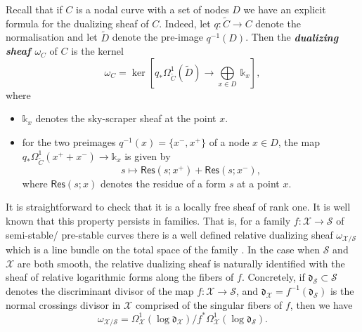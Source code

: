 \documentclass[11pt]{amsart}
\theoremstyle{plain}
\numberwithin{equation}{section}
\theoremstyle{definition}
\theoremstyle{plain}
\begin{document}
\noindent
Recall that if $C$ is a nodal curve with a set of nodes $D$ we have an explicit formula for the dualizing sheaf of $C$. Indeed, let  $q: \widetilde{C}\longrightarrow C$ denote the normalisation and let $\widetilde D$ denote the pre-image $q^{-1}(D)$. Then the \emph{\bfseries dualizing sheaf $\omega_C$} of $C$ is the kernel  
\begin{equation}
\omega_{C} = \ker \left[q_*\Omega_{\widetilde C}^{1}(\widetilde D)\longrightarrow \underset{x\in D}\bigoplus \ \mathbb k_x\right],
\end{equation}
where 
\begin{itemize}
\item $\mathbb k_x$ denotes the sky-scraper sheaf at the point $x$.
\item for the two preimages $q^{-1}(x) = \{x^{-},x^{+}\}$ of a node $x \in D$, the map \linebreak $q_*\Omega_{\widetilde C}^{1}(x^++x^-)\longrightarrow \mathbb k_x$ is given by 
\begin{equation}\label{res908}
s \mapsto \mathsf{Res}(s; x^+)+\mathsf{Res}(s;x^-), 
\end{equation}
where $\mathsf{Res}(s; x)$ denotes the residue of a form $s$ at a point $x$.
\end{itemize}
It is straightforward to check that it is a locally free sheaf of rank one.
It is well known  that this property persists in families. That is, for a family $f : \mathcal{X} \to \mathcal{S}$ of semi-stable/ pre-stable curves there is a well defined relative dualizing sheaf $\omega_{\mathcal{X}/\mathcal{S}}$ which is a line bundle on the total space of the family \cite[109.19 The relative dualizing sheaf]{34}. In the case when $\mathcal{S}$ and $\mathcal{X}$ are both smooth, the relative dualizing sheaf is naturally identified with the sheaf of relative logarithmic  forms along the fibers of $f$. Concretely, if 
$\boldsymbol{\mathfrak{d}}_{\mathcal{S}} \subset  \mathcal{S}$ denotes the discriminant divisor of the map 
$f : \mathcal{X} \to \mathcal{S}$, and $\boldsymbol{\mathfrak{d}}_{\mathcal{X}} = f^{-1}\left(\boldsymbol{\mathfrak{d}}_{\mathcal{S}}\right)$ is the normal crossings divisor in $\mathcal{X}$ comprised of the singular fibers of $f$, then we have
\[
\omega_{\mathcal{X}/\mathcal{S}} = \Omega^{1}_{\mathcal{X}}(\log \boldsymbol{\mathfrak{d}}_{\mathcal{X}})/f^{*} \Omega^{1}_{\mathcal{X}}(\log \boldsymbol{\mathfrak{d}}_{\mathcal{S}}).
\]
\end{document}
